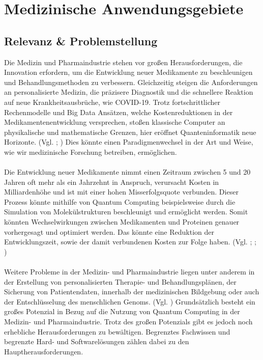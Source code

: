 \chapter{Medizinische Anwendungsgebiete}
\label{trends} %



\section{Relevanz \& Problemstellung}
Die Medizin und Pharmaindustrie stehen vor großen Herausforderungen, die Innovation erfordern, um die Entwicklung neuer Medikamente zu beschleunigen und Behandlungsmethoden zu verbessern. Gleichzeitig steigen die Anforderungen an personalisierte Medizin, die präzisere Diagnostik und die schnellere Reaktion auf neue Krankheitsausbrüche, wie COVID-19. Trotz fortschrittlicher Rechenmodelle und Big Data Ansätzen, welche Kostenreduktionen in der Medikamentenentwicklung versprechen, stoßen klassische Computer an physikalische und mathematische Grenzen, hier eröffnet Quanteninformatik neue Horizonte. (Vgl. \cite{blunt_perspective_2022}; \cite{shweta_quantum_2024}) Dies könnte einen Paradigmenwechsel in der Art und Weise, wie wir medizinische Forschung betreiben, ermöglichen.\\
\\
Die Entwicklung neuer Medikamente nimmt einen Zeitraum zwischen 5 und 20 Jahren oft mehr als ein Jahrzehnt in Anspruch, verursacht Kosten in Milliardenhöhe und ist mit einer hohen Misserfolgsquote verbunden. Dieser Prozess könnte mithilfe von Quantum Computing beispielsweise durch die Simulation von Molekülstrukturen beschleunigt und ermöglicht werden. Somit könnten Wechselwirkungen zwischen Medikamenten und Proteinen genauer vorhergesagt und optimiert werden. Das könnte eine Reduktion der Entwicklungszeit, sowie der damit verbundenen Kosten zur Folge haben. (Vgl. \cite{brown_clinical_2022}; \cite{schlander_how_2021}; \cite{shweta_quantum_2024})\\
\\
Weitere Probleme in der Medizin- und Pharmaindustrie liegen unter anderem in der Erstellung von personalisierten Therapie- und Behandlungsplänen, der Sicherung von Patientendaten, innerhalb der medizinischen Bildgebung oder auch der Entschlüsselung des menschlichen Genoms. (Vgl. \cite{shweta_quantum_2024}) Grundsätzlich besteht ein großes Potenzial in Bezug auf die Nutzung von Quantum Computing in der Medizin- und Pharmaindustrie. Trotz des großen Potenzials gibt es jedoch noch erhebliche Herausforderungen zu bewältigen. Begrenztes Fachwissen und begrenzte Hard- und Softwarelösungen zählen dabei zu den Hauptherausforderungen.


